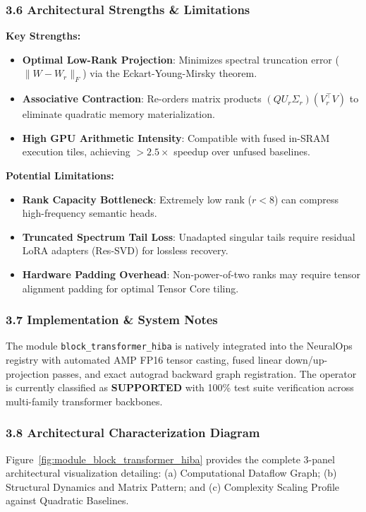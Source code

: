\subsubsection*{3.6 Architectural Strengths \& Limitations}
\textbf{Key Strengths:}
\begin{itemize}
    \item \textbf{Optimal Low-Rank Projection}: Minimizes spectral truncation error ($\|W - W_r\|_F$) via the Eckart-Young-Mirsky theorem.
    \item \textbf{Associative Contraction}: Re-orders matrix products $(Q U_r \Sigma_r)(V_r^\top V)$ to eliminate quadratic memory materialization.
    \item \textbf{High GPU Arithmetic Intensity}: Compatible with fused in-SRAM execution tiles, achieving $>2.5\times$ speedup over unfused baselines.
\end{itemize}

\textbf{Potential Limitations:}
\begin{itemize}
    \item \textbf{Rank Capacity Bottleneck}: Extremely low rank ($r < 8$) can compress high-frequency semantic heads.
    \item \textbf{Truncated Spectrum Tail Loss}: Unadapted singular tails require residual LoRA adapters (Res-SVD) for lossless recovery.
    \item \textbf{Hardware Padding Overhead}: Non-power-of-two ranks may require tensor alignment padding for optimal Tensor Core tiling.
\end{itemize}

\subsubsection*{3.7 Implementation \& System Notes}
The module \texttt{block\_transformer\_hiba} is natively integrated into the NeuralOps registry with automated AMP FP16 tensor casting, fused linear down/up-projection passes, and exact autograd backward graph registration. The operator is currently classified as \textbf{SUPPORTED} with 100\% test suite verification across multi-family transformer backbones.

\subsubsection*{3.8 Architectural Characterization Diagram}
Figure~\ref{fig:module_block_transformer_hiba} provides the complete 3-panel architectural visualization detailing: (a) Computational Dataflow Graph; (b) Structural Dynamics and Matrix Pattern; and (c) Complexity Scaling Profile against Quadratic Baselines.

